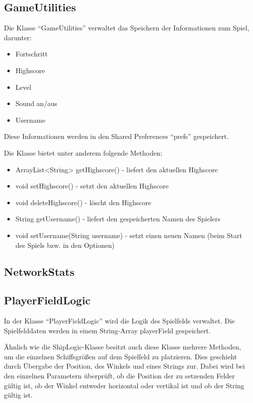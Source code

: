 \documentclass[11pt]{article} %
\begin{document}
\subsection{GameUtilities}
Die Klasse \enquote{GameUtilities} verwaltet das Speichern der Informationen zum Spiel, darunter:
\begin{itemize}
\item Fortschritt
\item Highscore
\item Level
\item Sound an/aus
\item Username
\end{itemize}

Diese Informationen werden in den Shared Preferences \enquote{prefs} gespeichert. 

Die Klasse bietet unter anderem folgende Methoden:
\begin{itemize}
\item ArrayList<String> getHighscore() - liefert den aktuellen Highscore
\item void setHighscore() - setzt den aktuellen Highscore
\item void deleteHighscore() - löscht den Highscore

\item String getUsername() - liefert den gespeicherten Namen des Spielers
\item void setUsername(String username) - setzt einen neuen Namen (beim Start des Spiels bzw. in den Optionen)
\end{itemize}

\subsection{NetworkStats}

\subsection{PlayerFieldLogic}
In der Klasse \enquote{PlayerFieldLogic} wird die Logik des Spielfelds verwaltet. Die Spielfelddaten werden in einem String-Array playerField gespeichert.

Ähnlich wie die ShipLogic-Klasse besitzt auch diese Klasse mehrere Methoden, um die einzelnen Schiffsgrößen auf dem Spielfeld zu platzieren. Dies geschieht durch Übergabe der Position, des Winkels und eines Strings zur. Dabei wird bei den einzelnen Parametern überprüft, ob die Position der zu setzenden Felder gültig ist, ob der Winkel entweder horizontal oder vertikal ist und ob der String gültig ist.
\end{document}
